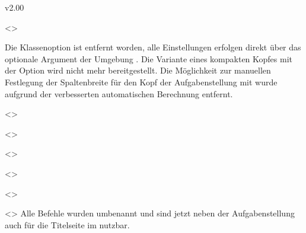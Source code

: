 \begin{Entity}{}
\begin{NoIndexDefault}
\begin{Cessations}{v2.00}
\begin{Entity}{}
\begin{Cessation}
  {}
  <>
\begin{Cessation}
  {}
\begin{Cessation}
  {}
\printdeclarationlist
%
Die Klassenoption  ist entfernt worden, alle Einstellungen 
erfolgen direkt über das optionale Argument der Umgebung . 
Die Variante eines kompakten Kopfes mit der Option  wird 
nicht mehr bereitgestellt. Die Möglichkeit zur manuellen Festlegung der 
Spaltenbreite für den Kopf der Aufgabenstellung mit  wurde 
aufgrund der verbesserten automatischen Berechnung entfernt.
\end{Cessation}
\end{Cessation}
\end{Cessation}

\begin{Cessation}
  {}
  <>
\begin{Cessation}
  {}
  <>
\begin{Cessation}
  {}
  <>
\begin{Cessation}
  {}
  <>
\begin{Cessation}
  {}
  <>
\begin{Cessation}
  {}
  <>
\printdeclarationlist
%
Alle Befehle wurden umbenannt und sind jetzt neben der Aufgabenstellung auch 
für die Titelseite im \CD nutzbar.
\end{Cessation}
\end{Cessation}
\end{Cessation}
\end{Cessation}
\end{Cessation}
\end{Cessation}


\end{Entity}
\end{Cessations}
\end{NoIndexDefault}
\end{Entity}
